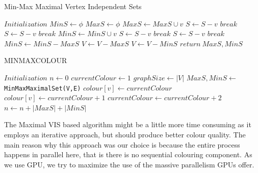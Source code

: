 \documentclass[MTech]{iitmdiss}
\begin{document}
\begin{algorithm}
\caption{Min-Max Maximal Vertex Independent Sets}\label{MinMaxSet}
\begin{algorithmic}[1]
\State $\textit{Initialization}$
\State $MinS \gets \phi$
\State $MaxS \gets \phi$
\State $MaxS \gets MaxS \cup v$
\State $S \gets S - v$
\State $\textit{break}$
\Else {} 
\State $S \gets S - v$
\State $\textit{break}$
\EndIf
\EndIf
\EndIf
\EndFor
\State $MinS \gets MinS \cup v$
\State $S \gets S - v$
\State $\textit{break}$
\Else {} 
\State $S \gets S - v$
\State $\textit{break}$
\EndIf
\EndIf
\EndIf
\EndFor
\EndFor
\State $MinS \gets MinS - MaxS$
\State $V \gets V - MaxS$
\State $V \gets V - MinS$
\State $\textit{return} \: MaxS, MinS$
\EndProcedure
\end{algorithmic}
\end{algorithm}

\begin{algorithm}
\caption{MINMAXCOLOUR}\label{MinMaxAlgo}
\begin{algorithmic}[1]
\State $\textit{Initialization}$
\State $n \gets 0$
\State $currentColour \gets 1$
\State $graphSize \gets |V|$
\State $MaxS, MinS \gets $\verb+MinMaxMaximalSet(V,E)+
\State $colour[v] \gets currentColour$
\EndFor
{}
\State $colour[v] \gets currentColour+1$
\EndFor
\State $currentColour \gets currentColour+2$
\State $n \gets n+|MaxS|+|MinS|$
\EndWhile
\EndProcedure
\end{algorithmic}
\end{algorithm}

The Maximal VIS based algorithm might be a little more time consuming as it employs an iterative approach, but should produce better colour quality. The main reason why this approach was our choice is because the entire process happens in parallel here, that is there is no sequential colouring component. As we use GPU, we try to maximize the use of the massive parallelism GPUs offer.
\end{document}
